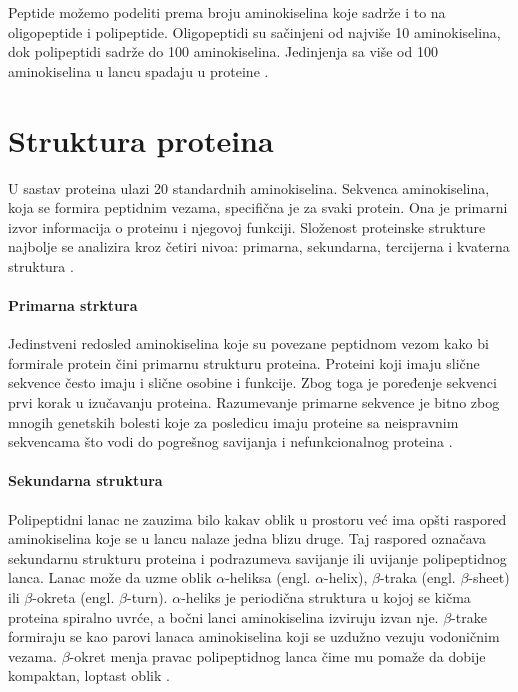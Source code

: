 Peptide možemo podeliti prema broju aminokiselina koje sadrže i to na oligopeptide i polipeptide. Oligopeptidi su sačinjeni od najviše 10 aminokiselina, dok polipeptidi sadrže do 100 aminokiselina. Jedinjenja sa više od 100 aminokiselina u lancu spadaju u proteine \cite{biohUdz}.



\section{Struktura proteina}

U sastav proteina ulazi 20 standardnih aminokiselina. Sekvenca aminokiselina, koja se formira peptidnim vezama, specifična je za svaki protein. Ona je primarni izvor informacija o proteinu i njegovoj funkciji. Složenost proteinske strukture najbolje se analizira kroz četiri nivoa: primarna, sekundarna, tercijerna i kvaterna struktura \cite{biochemestry5}.

\paragraph{Primarna strktura} Jedinstveni redosled aminokiselina koje su povezane peptidnom vezom kako bi formirale protein čini primarnu strukturu proteina. Proteini koji imaju slične sekvence često imaju i slične osobine i funkcije. Zbog toga je poređenje sekvenci prvi korak u izučavanju proteina. Razumevanje primarne sekvence je bitno zbog mnogih genetskih bolesti koje za posledicu imaju proteine sa neispravnim sekvencama što vodi do pogrešnog savijanja i nefunkcionalnog proteina \cite{biochemestry5, biohUdz, bioinf}.

\paragraph{Sekundarna struktura} Polipeptidni lanac ne zauzima bilo kakav oblik u prostoru već ima opšti raspored aminokiselina koje se u lancu nalaze jedna blizu druge. Taj raspored označava sekundarnu strukturu proteina i podrazumeva savijanje ili uvijanje polipeptidnog lanca. Lanac može da uzme oblik $\alpha$-heliksa (engl. $\alpha$-helix), $\beta$-traka (engl. $\beta$-sheet) ili $\beta$-okreta (engl. $\beta$-turn). $\alpha$-heliks je periodična struktura u kojoj se kičma proteina spiralno uvrće, a bočni lanci aminokiselina izviruju izvan nje. $\beta$-trake formiraju se kao parovi lanaca aminokiselina koji se uzdužno vezuju vodoničnim vezama. $\beta$-okret menja pravac polipeptidnog lanca čime mu pomaže da dobije kompaktan, loptast oblik \cite{biochemestry5, bioinf, PSF}.

